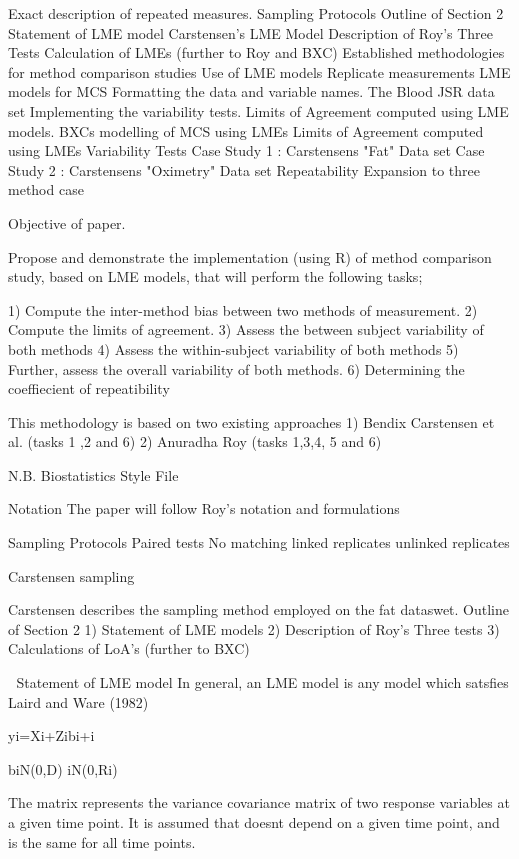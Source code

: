 

Exact description of repeated measures.
Sampling Protocols
Outline of Section 2
Statement of LME model
Carstensen's LME Model
Description of Roy's Three Tests
Calculation of LMEs (further to Roy and BXC)
Established methodologies for method comparison studies
Use of LME models
Replicate measurements
LME models for MCS
Formatting the data and variable names.
The Blood JSR data set
Implementing the variability tests.
Limits of Agreement computed using LME models.
BXCs modelling of MCS using LMEs
Limits of Agreement computed using LMEs
Variability Tests
Case Study 1 : Carstensens "Fat" Data set
Case Study 2 : Carstensens "Oximetry" Data set
Repeatability
Expansion to three method case
 
 
Objective of paper.
 
Propose and demonstrate the implementation (using R) of method comparison study, based on LME models, that will perform the following tasks;
 
1) Compute the inter-method bias between two methods of measurement.
2) Compute the limits of agreement.
3) Assess the between subject variability of both methods
4) Assess the within-subject variability of both methods
5) Further, assess the overall variability of both methods.
6) Determining the coeffiecient of repeatibility
 
This methodology is based on two existing approaches
1) Bendix Carstensen et al.      (tasks 1 ,2 and 6)
2) Anuradha Roy                    (tasks 1,3,4, 5 and 6)
 
 
    N.B. Biostatistics Style File 
 
Notation
The paper will follow Roy's notation and formulations

Sampling Protocols  
Paired tests
No matching
linked replicates
unlinked replicates
 
Carstensen sampling
 
Carstensen describes the sampling method employed on the fat dataswet.
Outline of Section 2
1) Statement of LME models
2) Description of Roy's Three tests
3) Calculations of LoA's (further to BXC)
 
 
Statement of LME model
In general, an LME model is any model which satsfies Laird and Ware (1982)
 
yi=Xi+Zibi+i
 
biN(0,D)
iN(0,Ri)
 
 
The matrix  represents the variance covariance matrix of two response variables at a given time point.
It is assumed that  doesnt depend on a given time point, and is the same for all time points.
 
